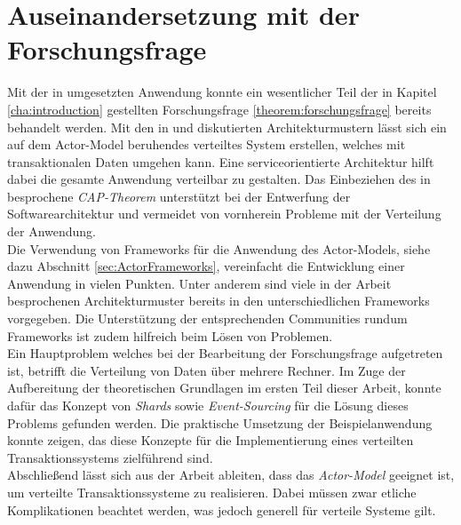 \section{Auseinandersetzung mit der Forschungsfrage}
Mit der in umgesetzten Anwendung konnte ein wesentlicher Teil der in Kapitel \ref{cha:introduction} gestellten Forschungsfrage \ref{theorem:forschungsfrage} bereits behandelt werden. Mit den in \cite{Vernon2015ReactiveAkka} und \cite{akkaInAction} diskutierten Architekturmustern lässt sich ein auf dem  Actor-Model beruhendes verteiltes System erstellen, welches mit transaktionalen Daten umgehen kann. Eine serviceorientierte Architektur hilft dabei die gesamte Anwendung verteilbar zu gestalten. 
Das Einbeziehen des in \cite{gilbertPerspectiveCAPTheorem2012} besprochene \textit{CAP-Theorem} unterstützt bei der Entwerfung der Softwarearchitektur und vermeidet von vornherein Probleme mit der Verteilung der Anwendung. \\ 
Die Verwendung von Frameworks für die Anwendung des Actor-Models, siehe dazu Abschnitt \ref{sec:ActorFrameworks}, vereinfacht die Entwicklung einer Anwendung in vielen Punkten. Unter anderem sind viele in der Arbeit besprochenen Architekturmuster bereits in den unterschiedlichen Frameworks vorgegeben. Die Unterstützung der entsprechenden Communities rundum Frameworks ist zudem hilfreich beim Lösen von Problemen. \\
Ein Hauptproblem welches bei der Bearbeitung der Forschungsfrage aufgetreten ist, betrifft die Verteilung von Daten über mehrere Rechner. Im Zuge der Aufbereitung der theoretischen Grundlagen im ersten Teil dieser Arbeit, konnte dafür das Konzept von \textit{Shards} sowie \textit{Event-Sourcing} für die Lösung dieses Problems gefunden werden. Die praktische Umsetzung der Beispielanwendung konnte zeigen, das diese Konzepte für die Implementierung eines verteilten Transaktionssystems zielführend sind. \\
Abschließend lässt sich aus der Arbeit ableiten, dass das \textit{Actor-Model} geeignet ist, um verteilte Transaktionssysteme zu realisieren. Dabei müssen zwar etliche Komplikationen beachtet werden, was jedoch generell für verteile Systeme gilt.

